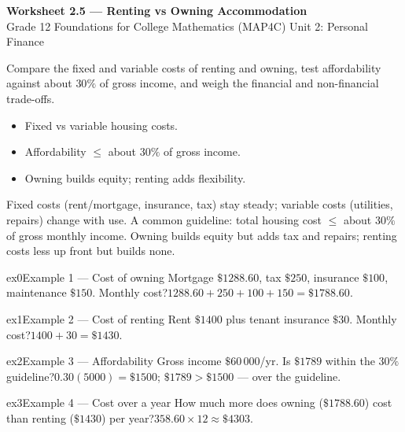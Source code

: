 \documentclass[11pt]{article}
\begin{document}
\begin{center}
{\LARGE\bfseries\color{titleblue}Worksheet 2.5 --- Renting vs Owning Accommodation}\\[2pt]
{\small Grade 12 Foundations for College Mathematics (MAP4C) \textperiodcentered{} Unit 2: Personal Finance}
\end{center}

\begin{ideabox}
Compare the fixed and variable costs of renting and owning, test affordability against about $30\%$ of gross income, and weigh the financial and non-financial trade-offs.
\begin{itemize}[leftmargin=*,itemsep=2pt]
  \item Fixed vs variable housing costs.
  \item Affordability $\le$ about $30\%$ of gross income.
  \item Owning builds equity; renting adds flexibility.
\end{itemize}
\end{ideabox}

\begin{learnbox}
Fixed costs (rent/mortgage, insurance, tax) stay steady; variable costs (utilities, repairs) change with use.
A common guideline: total housing cost $\le$ about $30\%$ of gross monthly income.
Owning builds equity but adds tax and repairs; renting costs less up front but builds none.
\end{learnbox}


\begin{example}{ex0}{Example 1 --- Cost of owning}
Mortgage $\$1288.60$, tax $\$250$, insurance $\$100$, maintenance $\$150$. Monthly cost?\soln $1288.60+250+100+150=\$1788.60$.
\end{example}

\begin{example}{ex1}{Example 2 --- Cost of renting}
Rent $\$1400$ plus tenant insurance $\$30$. Monthly cost?\soln $1400+30=\$1430$.
\end{example}

\begin{example}{ex2}{Example 3 --- Affordability}
Gross income $\$60\,000$/yr. Is $\$1789$ within the $30\%$ guideline?\soln $0.30(5000)=\$1500$; $\$1789>\$1500$ — over the guideline.
\end{example}

\begin{example}{ex3}{Example 4 --- Cost over a year}
How much more does owning ($\$1788.60$) cost than renting ($\$1430$) per year?\soln $358.60\times12\approx\$4303$.
\end{example}
\end{document}
